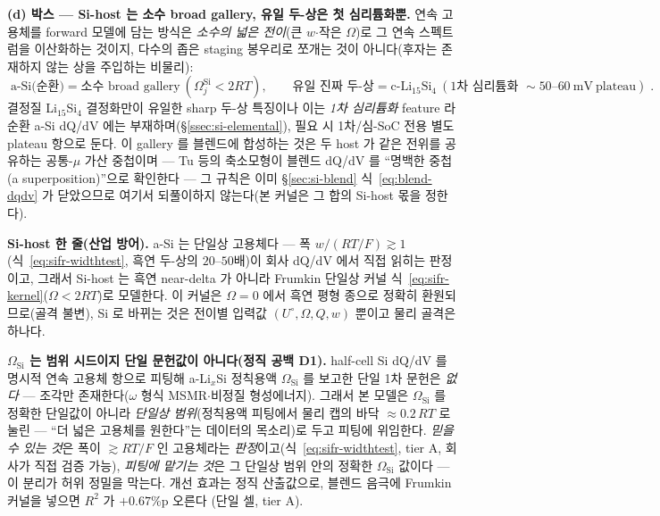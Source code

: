\textbf{(d) 박스 --- Si-host 는 소수 broad gallery, 유일 두-상은 첫 심리튬화뿐.} 연속 고용체를 forward 모델에
담는 방식은 \emph{소수의 넓은 전이}(큰 $w$$\cdot$작은 $\Omega$)로 그 연속 스펙트럼을 이산화하는 것이지,
다수의 좁은 staging 봉우리로 쪼개는 것이 아니다(후자는 존재하지 않는 상을 주입하는 비물리):
\begin{equation}
\boxed{\;
\text{a-Si(순환)}=\text{소수 broad gallery}\ (\Omega_j^{\mathrm{Si}}<2RT),\qquad
\text{유일 진짜 두-상}=\text{c-Li}_{15}\text{Si}_4\ (\text{1차 심리튬화 }\sim50\text{--}60\ \mathrm{mV\ plateau})\;.}
\label{eq:sifr-gallery}
\end{equation}
결정질 Li$_{15}$Si$_4$ 결정화만이 유일한 sharp 두-상 특징이나 이는 \emph{1차 심리튬화} feature 라 순환 a-Si dQ/dV
에는 부재하며(\S\ref{ssec:si-elemental}), 필요 시 1차/심-SoC 전용 별도 plateau 항으로 둔다. 이 gallery 를 블렌드에
합성하는 것은 두 host 가 같은 전위를 공유하는 공통-$\mu$ 가산 중첩이며 --- Tu 등의 축소모형이 블렌드 dQ/dV 를
``명백한 중첩(a superposition)''으로 확인한다\cite{tu_blend2024} --- 그 규칙은 이미 \S\ref{sec:si-blend}
식~\eqref{eq:blend-dqdv} 가 닫았으므로 여기서 되풀이하지 않는다(본 커널은 그 합의 Si-host 몫을 정한다).

\begin{keybox}
\textbf{Si-host 한 줄(산업 방어).} a-Si 는 단일상 고용체다 --- 폭 $w/(RT/F)\gtrsim1$(식~\eqref{eq:sifr-widthtest},
흑연 두-상의 $20$--$50$배)이 회사 dQ/dV 에서 직접 읽히는 판정이고, 그래서 Si-host 는 흑연 near-delta 가 아니라
Frumkin 단일상 커널 식~\eqref{eq:sifr-kernel}($\Omega<2RT$)로 모델한다. 이 커널은 $\Omega=0$ 에서 흑연 평형 종으로
정확히 환원되므로(골격 불변), Si 로 바뀌는 것은 전이별 입력값 $(U^{\circ},\Omega,Q,w)$ 뿐이고 물리 골격은 하나다.
\end{keybox}

\begin{warnbox}
\textbf{$\Omega_\mathrm{Si}$ 는 범위 시드이지 단일 문헌값이 아니다(정직 공백 D1).} half-cell Si dQ/dV 를 명시적
연속 고용체 항으로 피팅해 a-Li$_x$Si 정칙용액 $\Omega_\mathrm{Si}$ 를 보고한 단일 1차 문헌은 \emph{없다} --- 조각만
존재한다($\omega$ 형식 MSMR\cite{msmr_origin2017}$\cdot$비정질 형성에너지\cite{artrith2018}). 그래서 본 모델은
$\Omega_\mathrm{Si}$ 를 정확한 단일값이 아니라 \emph{단일상 범위}(정칙용액 피팅에서 물리 캡의 바닥
$\approx0.2\,RT$ 로 눌린 --- ``더 넓은 고용체를 원한다''는 데이터의 목소리)로 두고 피팅에 위임한다. \emph{믿을 수
있는 것}은 폭이 $\gtrsim RT/F$ 인 고용체라는 \emph{판정}이고(식~\eqref{eq:sifr-widthtest}, tier A, 회사가 직접
검증 가능), \emph{피팅에 맡기는 것}은 그 단일상 범위 안의 정확한 $\Omega_\mathrm{Si}$ 값이다 --- 이 분리가
허위 정밀을 막는다. 개선 효과는 정직 산출값으로, 블렌드 음극에 Frumkin 커널을 넣으면 $R^2$ 가 $+0.67$\%p 오른다
(단일 셀, tier A).
\end{warnbox}

